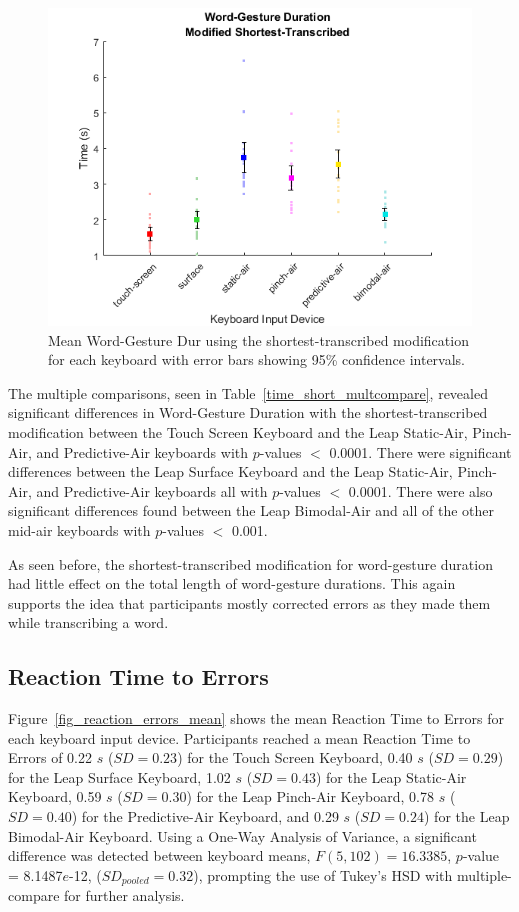 \begin{figure}[h]
	\centering
	\includegraphics{fig_time_short_mean}
	\caption[Mean Word-Gesture Dur for Modified-Shortest]{Mean Word-Gesture Dur using the shortest-transcribed modification for each keyboard with error bars showing 95\% confidence intervals.}
	\label{fig_time_short_mean}
\end{figure}

The multiple comparisons, seen in Table~\ref{time_short_multcompare}, revealed significant differences in Word-Gesture Duration with the shortest-transcribed modification between the Touch Screen Keyboard and the Leap Static-Air, Pinch-Air, and Predictive-Air keyboards with $p$-values $<$ 0.0001. There were significant differences between the Leap Surface Keyboard and the Leap Static-Air, Pinch-Air, and Predictive-Air keyboards all with $p$-values $<$ 0.0001. There were also significant differences found between the Leap Bimodal-Air and all of the other mid-air keyboards with $p$-values $<$ 0.001.

As seen before, the shortest-transcribed modification for word-gesture duration had little effect on the total length of word-gesture durations. This again supports the idea that participants mostly corrected errors as they made them while transcribing a word.

\subsection{Reaction Time to Errors}
Figure~\ref{fig_reaction_errors_mean} shows the mean Reaction Time to Errors for each keyboard input device. Participants reached a mean Reaction Time to Errors of 0.22 $s$ ($SD = 0.23$) for the Touch Screen Keyboard, 0.40 $s$ ($SD = 0.29$) for the Leap Surface Keyboard, 1.02 $s$ ($SD = 0.43$) for the Leap Static-Air Keyboard, 0.59 $s$ ($SD = 0.30$) for the Leap Pinch-Air Keyboard, 0.78 $s$ ($SD = 0.40$) for the Predictive-Air Keyboard, and 0.29 $s$ ($SD = 0.24$) for the Leap Bimodal-Air Keyboard. Using a One-Way Analysis of Variance, a significant difference was detected between keyboard means, $F(5, 102) = 16.3385$, $p$-value = 8.1487$e$-12, ($SD_{pooled} = 0.32$), prompting the use of Tukey's HSD with multiple-compare for further analysis.

